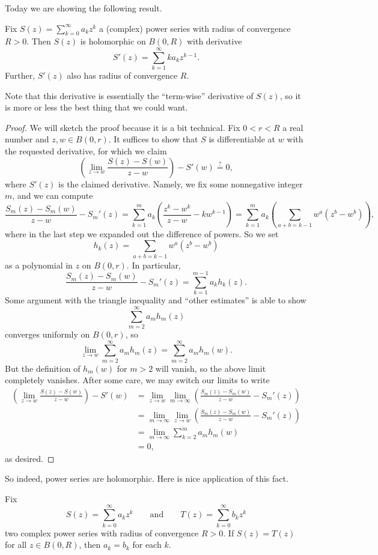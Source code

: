 Today we are showing the following result.
\begin{proposition} \label{prop:powerseriesholo}
	Fix $S(z)=\sum_{k=0}^\infty a_kz^k$ a (complex) power series with radius of convergence $R>0$. Then $S(z)$ is holomorphic on $B(0,R)$ with derivative
	\[S'(z)=\sum_{k=1}^\infty ka_kz^{k-1}.\]
	Further, $S'(z)$ also has radius of convergence $R$.
\end{proposition}
Note that this derivative is essentially the ``term-wise'' derivative of $S(z)$, so it is more or less the best thing that we could want.
\begin{proof}
	We will sketch the proof because it is a bit technical. Fix $0<r<R$ a real number and $z,w\in B(0,r)$. It suffices to show that $S$ is differentiable at $w$ with the requested derivative, for which we claim
	\[\left(\lim_{z\to w}\frac{S(z)-S(w)}{z-w}\right)-S'(w)\stackrel?=0,\]
	where $S'(z)$ is the claimed derivative. Namely, we fix some nonnegative integer $m$, and we can compute
	\[\frac{S_m(z)-S_m(w)}{z-w}-S_m'(z)=\sum_{k=1}^ma_k\left(\frac{z^k-w^k}{z-w}-kw^{k-1}\right)=\sum_{k=1}^ma_k\left(\sum_{a+b=k-1}w^a\left(z^b-w^b\right)\right),\]
	where in the last step we expanded out the difference of powers. So we set
	\[h_k(z)=\sum_{a+b=k-1}w^a\left(z^b-w^b\right)\]
	as a polynomial in $z$ on $B(0,r)$. In particular,
	\[\frac{S_m(z)-S_m(w)}{z-w}-S_m'(z)=\sum_{k=1}^{m-1}a_kh_k(z).\]
	Some argument with the triangle inequality and ``other estimates'' is able to show
	\[\sum_{m=2}^\infty a_mh_m(z)\]
	converges uniformly on $B(0,r)$, so
	\[\lim_{z\to w}\sum_{m=2}^\infty a_mh_m(z)=\sum_{m=2}^\infty a_mh_m(w).\]
	But the definition of $h_m(w)$ for $m>2$ will vanish, so the above limit completely vanishes. After some care, we may switch our limits to write
	\begin{align*}
		\left(\lim_{z\to w}\frac{S(z)-S(w)}{z-w}\right)-S'(w) &= \lim_{z\to w}\lim_{m\to\infty}\left(\frac{S_m(z)-S_m(w)}{z-w}-S_m'(z)\right) \\
		&= \lim_{m\to\infty}\lim_{z\to w}\left(\frac{S_m(z)-S_m(w)}{z-w}-S_m'(z)\right) \\
		&= \lim_{m\to\infty}\sum_{k=2}^ma_mh_m(w) \\
		&= 0,
	\end{align*}
	as desired.
\end{proof}
So indeed, power series are holomorphic. Here is nice application of this fact.
\begin{corollary}
	Fix
	\[S(z)=\sum_{k=0}^\infty a_kz^k\qquad\text{and}\qquad T(z)=\sum_{k=0}^\infty b_kz^k\]
	two complex power series with radius of convergence $R>0$. If $S(z)=T(z)$ for all $z\in B(0,R)$, then $a_k=b_k$ for each $k$.
\end{corollary}
